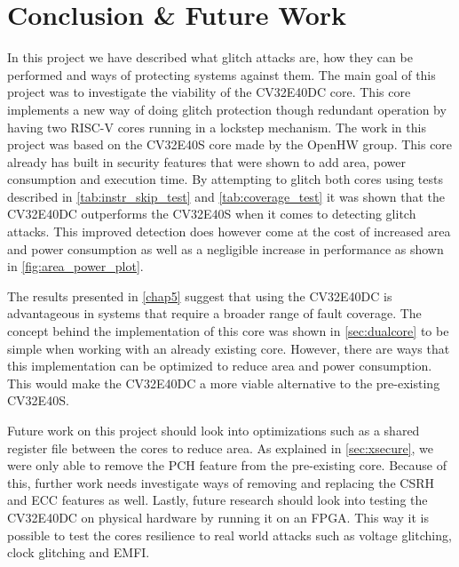 \chapter{Conclusion \& Future Work}
\label{chap6}

In this project we have described what glitch attacks are, how they can be performed and ways of protecting systems against them. The main goal of this project was to investigate the viability of the CV32E40DC core. This core implements a new way of doing glitch protection though redundant operation by having two RISC-V cores running in a lockstep mechanism. The work in this project was based on the CV32E40S core\cite{cv32e40s_github} made by the OpenHW group\cite{cv32e40s_manual}. This core already has built in security features that were shown to add area, power consumption and execution time. By attempting to glitch both cores using tests described in \autoref{tab:instr_skip_test} and \autoref{tab:coverage_test} it was shown that the CV32E40DC outperforms the CV32E40S when it comes to detecting glitch attacks. This improved detection does however come at the cost of increased area and power consumption as well as a negligible increase in performance as shown in \autoref{fig:area_power_plot}. 

The results presented in \autoref{chap5} suggest that using the CV32E40DC is advantageous in systems that require a broader range of fault coverage. The concept behind the implementation of this core was shown in \autoref{sec:dualcore} to be simple when working with an already existing core. However, there are ways that this implementation can be optimized to reduce area and power consumption. This would make the CV32E40DC a more viable alternative to the pre-existing CV32E40S. 

Future work on this project should look into optimizations such as a shared register file between the cores to reduce area. As explained in \autoref{sec:xsecure}, we were only able to remove the PCH feature from the pre-existing core. Because of this, further work needs investigate ways of removing and replacing the CSRH and ECC features as well. Lastly, future research should look into testing the CV32E40DC on physical hardware by running it on an FPGA. This way it is possible to test the cores resilience to real world attacks such as voltage glitching, clock glitching and EMFI. 